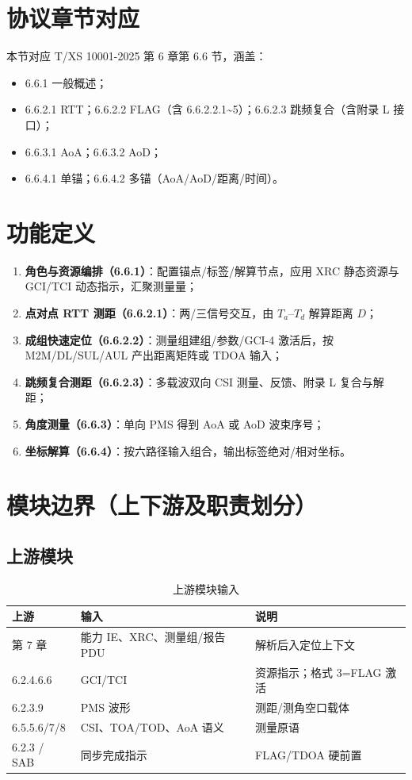 \documentclass[11pt,a4paper]{ctexart}
\begin{document}
\section{协议章节对应}

本节对应 T/XS 10001-2025 第 6 章第 6.6 节，涵盖：
\begin{itemize}[nosep]
  \item 6.6.1 一般概述；
  \item 6.6.2.1 RTT；6.6.2.2 FLAG（含 6.6.2.2.1\textasciitilde 5）；6.6.2.3 跳频复合（含附录 L 接口）；
  \item 6.6.3.1 AoA；6.6.3.2 AoD；
  \item 6.6.4.1 单锚；6.6.4.2 多锚（AoA/AoD/距离/时间）。
\end{itemize}

\section{功能定义}

\begin{enumerate}[nosep]
  \item \textbf{角色与资源编排（6.6.1）}：配置锚点/标签/解算节点，应用 XRC 静态资源与 GCI/TCI 动态指示，汇聚测量量；
  \item \textbf{点对点 RTT 测距（6.6.2.1）}：两/三信号交互，由 $T_a$--$T_d$ 解算距离 $D$；
  \item \textbf{成组快速定位（6.6.2.2）}：测量组建组/参数/GCI-4 激活后，按 M2M/DL/SUL/AUL 产出距离矩阵或 TDOA 输入；
  \item \textbf{跳频复合测距（6.6.2.3）}：多载波双向 CSI 测量、反馈、附录 L 复合与解距；
  \item \textbf{角度测量（6.6.3）}：单向 PMS 得到 AoA 或 AoD 波束序号；
  \item \textbf{坐标解算（6.6.4）}：按六路径输入组合，输出标签绝对/相对坐标。
\end{enumerate}

\section{模块边界（上下游及职责划分）}

\subsection{上游模块}

\begin{longtable}{L{4cm}L{4.5cm}L{5.5cm}}
\caption{上游模块输入\label{tab:66-up}} \\
\toprule
\textbf{上游} & \textbf{输入} & \textbf{说明} \\
\midrule
第 7 章 & 能力 IE、XRC、测量组/报告 PDU & 解析后入定位上下文 \\
6.2.4.6.6 & GCI/TCI & 资源指示；格式 3=FLAG 激活 \\
6.2.3.9 & PMS 波形 & 测距/测角空口载体 \\
6.5.5.6/7/8 & CSI、TOA/TOD、AoA 语义 & 测量原语 \\
6.2.3 / SAB & 同步完成指示 & FLAG/TDOA 硬前置 \\
\bottomrule
\end{longtable}
\end{document}

